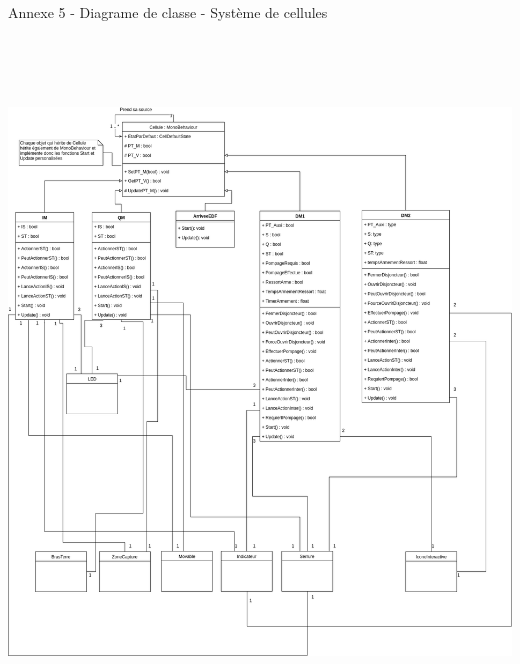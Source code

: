 \documentclass[a4paper]{article}
\begin{document}
    \newpage

    \vfill
    \huge Annexe 5 - Diagrame de classe - Système de cellules \\
    \vspace{10pt}
    \includegraphics[width=16.5cm,height=19cm]{img/DiagClassCellules}
    \vfill

    \newpage
\end{document}
